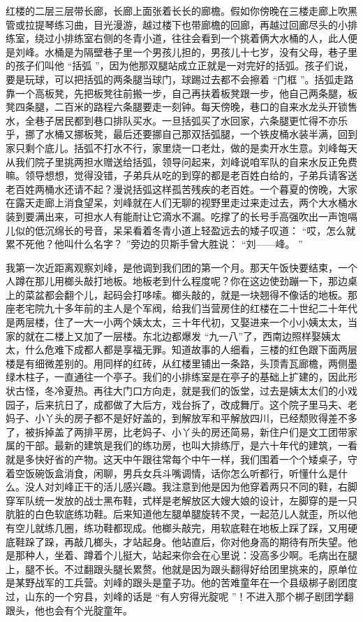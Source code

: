 \documentclass[12pt,twoside,openany]{book}
\begin{document}
红楼的二层三层带长廊，长廊上面张着长长的廊檐。假如你傍晚在三楼走廊上吹黑管或拉提琴练习曲，目光漫游，越过楼下也带廊檐的回廊，再越过回廊尽头的小排练室，绕过小排练室右侧的冬青小道，往往会看到一个挑着俩大水桶的人，此人便是刘峰。水桶是为隔壁巷子里一个男孩儿担的，男孩儿十七岁，没有父母，巷子里的孩子们叫他 “括弧 ”，因为他那双腿站成立正就是一对完好的括弧。孩子们说，要是玩球，可以把括弧的两条腿当球门，球踢过去都不会擦着 “门框 ”。括弧走路靠一个高板凳，先把板凳往前搬一步，自己再扶着板凳跟一步，他自己两条腿，板凳四条腿，二百米的路程六条腿要走一刻钟。每天傍晚，巷口的自来水龙头开锁售水，全巷子居民都到巷口排队买水。一旦括弧买了水回家，六条腿更忙得不亦乐乎，挪了水桶又挪板凳，最后还要挪自己那双括弧腿，一个铁皮桶水装半满，回到家只剩个底儿。括弧不打水不行，家里烧一口老灶，做的是卖开水生意。刘峰每天从我们院子里挑两担水赠送给括弧，领导问起来，刘峰说咱军队的自来水反正免费嘛。领导想想，觉得没错，子弟兵从吃的到穿的都是老百姓白给的，子弟兵请客送老百姓两桶水还请不起？漫说括弧这样孤苦残疾的老百姓。一个暮夏的傍晚，大家在露天走廊上消食望呆，刘峰就在人们无聊的视野里走过来走过去，两个大水桶水装到要满出来，可担水人有能耐让它滴水不漏。吃撑了的长号手高强吹出一声饱嗝儿似的低沉绵长的号音，呆呆看着冬青小道上轻盈远去的矮子叹道： “哎，怎么就累不死他？他叫什么名字？ ”旁边的贝斯手曾大胜说： “刘——峰。 ”

我第一次近距离观察刘峰，是他调到我们团的第一个月。那天午饭快要结束，一个人蹲在那儿用榔头敲打地板。地板老到什么程度呢？你在这边使劲蹦一下，那边桌上的菜盆都会翻个儿，起码会打哆嗦。榔头敲的，就是一块翘得不像话的地板。那座老宅院九十多年前的主人是个军阀，给我们当营房住的红楼在二十世纪二十年代是两层楼，住了一大一小两个姨太太，三十年代初，又娶进来一个小小姨太太，当家的就在二楼上又加了一层楼。东北边都爆发 “九一八”了，西南边照样娶姨太太，什么危难下成都人都是享福无罪。知道故事的人细看，三楼的红色跟下面两层楼是有细微差别的。用同样的红砖，从红楼里铺出一条路，头顶青瓦廊檐，两侧墨绿木柱子，一直通往一个亭子。我们的小排练室是在亭子的基础上扩建的，因此形状古怪，冬冷夏热。再往大门口方向走，就是我们的饭堂，过去是姨太太们的小戏园子，后来抗日了，成都做了大后方，戏台拆了，改成舞厅。这个院子里马夫、老妈子、小丫头的房子都不是好好盖的，到解放军和平解放四川，已经颓败得差不多了，被拆掉盖了两排平房，比老妈子、小丫头的房还简易，新住户们是文工团带家属的干部。最新的建筑是我们的练功房，也叫大排练厅，是六十年代的建筑，一看就是多快好省的产物。这天中午跟往常每个中午一样，我们围着一个个矮桌子，守着空饭碗饭盒消食，闲聊，男兵女兵斗嘴调情，话你怎么听都行，听懂什么是什么。没人对刘峰正干的活儿感兴趣。我注意到他是因为他穿着两只不同的鞋，右脚穿军队统一发放的战士黑布鞋，式样是老解放区大嫂大娘的设计，左脚穿的是一只肮脏的白色软底练功鞋。后来知道他左腿单腿旋转不灵，一起范儿人就歪，所以他有空儿就练几圈，练功鞋都现成。他榔头敲完，用软底鞋在地板上踩了踩，又用硬底鞋跺了跺，再敲几榔头，才站起身。他站直后，你对他身高的期待有所失望。他是那种人，坐着、蹲着个儿挺大，站起来你会在心里说：没高多少啊。毛病出在腿上，腿不长。不过翻跟头腿长累赘。他就是因为跟头翻得好给团里挑来的，原单位是某野战军的工兵营。刘峰的跟头是童子功。他的苦难童年在一个县级梆子剧团度过，山东的一个穷县，刘峰的话是 “有人穷得光腚呢 ”！不进入那个梆子剧团学翻跟头，他也会有个光腚童年。
\end{document}
